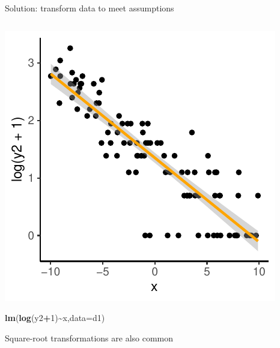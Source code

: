 \documentclass[
  ignorenonframetext,
  aspectratio=169]{beamer}
\newenvironment{Shaded}{\begin{snugshade}}{\end{snugshade}}
\newcommand{\AttributeTok}[1]{\textcolor[rgb]{0.13,0.29,0.53}{#1}}
\newcommand{\DecValTok}[1]{\textcolor[rgb]{0.00,0.00,0.81}{#1}}
\newcommand{\FunctionTok}[1]{\textcolor[rgb]{0.13,0.29,0.53}{\textbf{#1}}}
\newcommand{\NormalTok}[1]{#1}
\newcommand{\SpecialCharTok}[1]{\textcolor[rgb]{0.81,0.36,0.00}{\textbf{#1}}}
\let\oldShaded\Shaded %
\let\endoldShaded\endShaded
\renewenvironment{Shaded}{\scriptsize\oldShaded}{\endoldShaded}
\begin{document}
\begin{frame}[fragile]{Solution: transform data to meet assumptions}
\protect\hypertarget{solution-transform-data-to-meet-assumptions}{}
\begin{columns}[T]
\begin{column}{0.48\textwidth}
\includegraphics{03-Lecture_files/figure-beamer/unnamed-chunk-36-1.pdf}

\begin{Shaded}
\begin{Highlighting}[]
\FunctionTok{lm}\NormalTok{(}\FunctionTok{log}\NormalTok{(y2}\SpecialCharTok{+}\DecValTok{1}\NormalTok{)}\SpecialCharTok{\textasciitilde{}}\NormalTok{x,}\AttributeTok{data=}\NormalTok{d1)}
\end{Highlighting}
\end{Shaded}

Square-root transformations are also common
\end{column}


\end{columns}
\end{frame}
\end{document}
